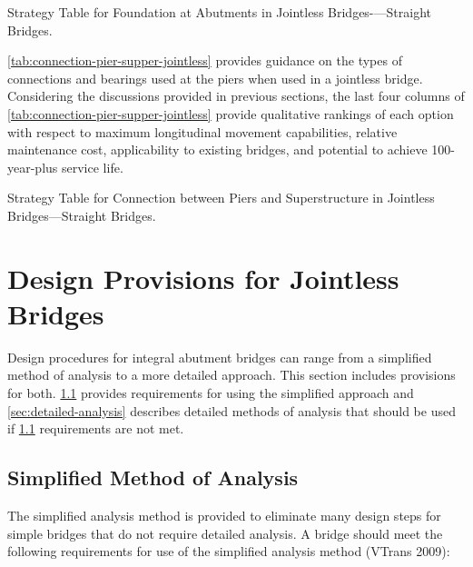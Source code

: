 \begin{table}
  \caption{Strategy Table for Foundation at Abutments in Jointless Bridges-—Straight Bridges.}\label{tab:foundation-select-jointless}
\end{table}

\cref{tab:connection-pier-supper-jointless} provides guidance on the types of connections and bearings used at the piers when used in a jointless bridge. Considering the discussions provided in previous sections, the last four columns of \cref{tab:connection-pier-supper-jointless} provide qualitative rankings of each option with respect to maximum longitudinal movement capabilities, relative maintenance cost, applicability to existing bridges, and potential to achieve 100-year-plus service life.

\begin{table}
  \caption{Strategy Table for Connection between Piers and Superstructure in Jointless Bridges—Straight Bridges.}\label{tab:connection-pier-supper-jointless}
\end{table}

\section{Design Provisions for Jointless Bridges}
Design procedures for integral abutment bridges can range from a simplified method of analysis to a more
detailed approach. This section includes provisions for both. \cref{sec:smiplified-analysis} provides requirements for using the simplified approach and \cref{sec:detailed-analysis} describes detailed methods of analysis that should be used if \cref{sec:smiplified-analysis}
requirements are not met.

\subsection{Simplified Method of Analysis}\label{sec:smiplified-analysis}
The simplified analysis method is provided to eliminate many design steps for simple bridges that do not require
detailed analysis. A bridge should meet the following requirements for use of the simplified analysis method (VTrans
2009):

